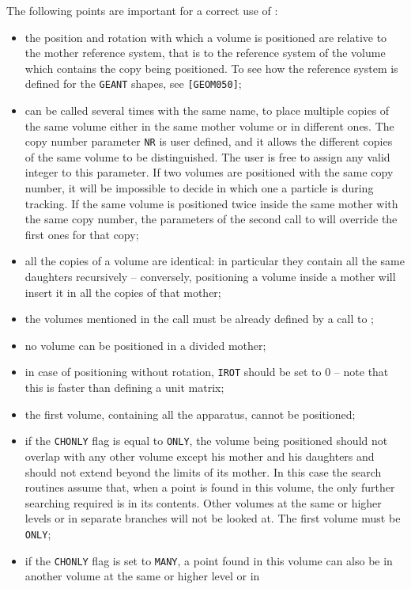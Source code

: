 The following points are important for a correct use of :
\begin{itemize}
\item the position and rotation with which a volume is positioned are
relative to the mother reference system, that is to the reference system
of the volume which contains the copy being positioned. To see how the
reference system is defined for the {\tt GEANT} shapes, see {\tt [GEOM050]};
\item 
{} can be called several times with the same name, to place 
multiple copies of the same volume either in the
same mother volume or in different ones.
The copy number parameter {\tt NR} is user defined, and it allows
the different copies of the same volume to be distinguished. The user is
free to assign any valid integer to this parameter. If two volumes
are positioned with the same copy number, it will be impossible to decide
in which one a particle is during tracking. If the same volume is positioned
twice inside the same mother with the same copy number, the parameters
of the second call to  will override the first ones for that
copy;
\item all the copies of a volume are identical: in particular they contain
all the same daughters recursively -- conversely, positioning a volume 
inside a mother will insert it in all the copies of that mother;
\item the volumes mentioned in the call must be already defined by a call
to ;
\item no volume can be positioned in a divided mother;
\item in case of positioning without rotation, {\tt IROT} should be set
to 0 -- note that this is faster than defining a unit matrix;
\item the first volume, containing all the apparatus, cannot be positioned;
\item if the {\tt CHONLY} flag is equal to {\tt ONLY}, the volume being
positioned should not overlap with any other volume except his mother
and his daughters and should not extend beyond the limits of its mother. 
In this case the search routines assume that, when a point
is found in this volume, the only further searching required is in its contents.
Other volumes at the same or higher levels
or in separate branches will not be looked at. The first volume must be 
{\tt ONLY};
\item if the {\tt CHONLY} flag is set to {\tt MANY}, a point found in
this volume can also be in another volume at the same or higher level or in

\end{itemize}
